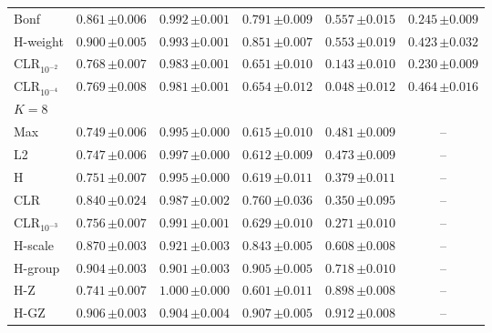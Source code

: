 \begin{tabular}{lccccc}
Bonf & $0.861\,{\scriptstyle\pm 0.006}$ & $0.992\,{\scriptstyle\pm 0.001}$ & $0.791\,{\scriptstyle\pm 0.009}$ & $0.557\,{\scriptstyle\pm 0.015}$ & $0.245\,{\scriptstyle\pm 0.009}$ \\
H-weight & $0.900\,{\scriptstyle\pm 0.005}$ & $0.993\,{\scriptstyle\pm 0.001}$ & $0.851\,{\scriptstyle\pm 0.007}$ & $0.553\,{\scriptstyle\pm 0.019}$ & $0.423\,{\scriptstyle\pm 0.032}$ \\
CLR$_{10^{-2}}$ & $0.768\,{\scriptstyle\pm 0.007}$ & $0.983\,{\scriptstyle\pm 0.001}$ & $0.651\,{\scriptstyle\pm 0.010}$ & $0.143\,{\scriptstyle\pm 0.010}$ & $0.230\,{\scriptstyle\pm 0.009}$ \\
CLR$_{10^{-4}}$ & $0.769\,{\scriptstyle\pm 0.008}$ & $0.981\,{\scriptstyle\pm 0.001}$ & $0.654\,{\scriptstyle\pm 0.012}$ & $0.048\,{\scriptstyle\pm 0.012}$ & $0.464\,{\scriptstyle\pm 0.016}$ \\
\midrule
\multicolumn{6}{l}{$K=8$} \\
Max & $0.749\,{\scriptstyle\pm 0.006}$ & $0.995\,{\scriptstyle\pm 0.000}$ & $0.615\,{\scriptstyle\pm 0.010}$ & $0.481\,{\scriptstyle\pm 0.009}$ & -- \\
L2 & $0.747\,{\scriptstyle\pm 0.006}$ & $0.997\,{\scriptstyle\pm 0.000}$ & $0.612\,{\scriptstyle\pm 0.009}$ & $0.473\,{\scriptstyle\pm 0.009}$ & -- \\
H & $0.751\,{\scriptstyle\pm 0.007}$ & $0.995\,{\scriptstyle\pm 0.000}$ & $0.619\,{\scriptstyle\pm 0.011}$ & $0.379\,{\scriptstyle\pm 0.011}$ & -- \\
CLR & $0.840\,{\scriptstyle\pm 0.024}$ & $0.987\,{\scriptstyle\pm 0.002}$ & $0.760\,{\scriptstyle\pm 0.036}$ & $0.350\,{\scriptstyle\pm 0.095}$ & -- \\
CLR$_{10^{-3}}$ & $0.756\,{\scriptstyle\pm 0.007}$ & $0.991\,{\scriptstyle\pm 0.001}$ & $0.629\,{\scriptstyle\pm 0.010}$ & $0.271\,{\scriptstyle\pm 0.010}$ & -- \\
H-scale & $0.870\,{\scriptstyle\pm 0.003}$ & $0.921\,{\scriptstyle\pm 0.003}$ & $0.843\,{\scriptstyle\pm 0.005}$ & $0.608\,{\scriptstyle\pm 0.008}$ & -- \\
H-group & $0.904\,{\scriptstyle\pm 0.003}$ & $0.901\,{\scriptstyle\pm 0.003}$ & $0.905\,{\scriptstyle\pm 0.005}$ & $0.718\,{\scriptstyle\pm 0.010}$ & -- \\
H-Z & $0.741\,{\scriptstyle\pm 0.007}$ & $1.000\,{\scriptstyle\pm 0.000}$ & $0.601\,{\scriptstyle\pm 0.011}$ & $0.898\,{\scriptstyle\pm 0.008}$ & -- \\
H-GZ & $0.906\,{\scriptstyle\pm 0.003}$ & $0.904\,{\scriptstyle\pm 0.004}$ & $0.907\,{\scriptstyle\pm 0.005}$ & $0.912\,{\scriptstyle\pm 0.008}$ & -- \\

\end{tabular}
